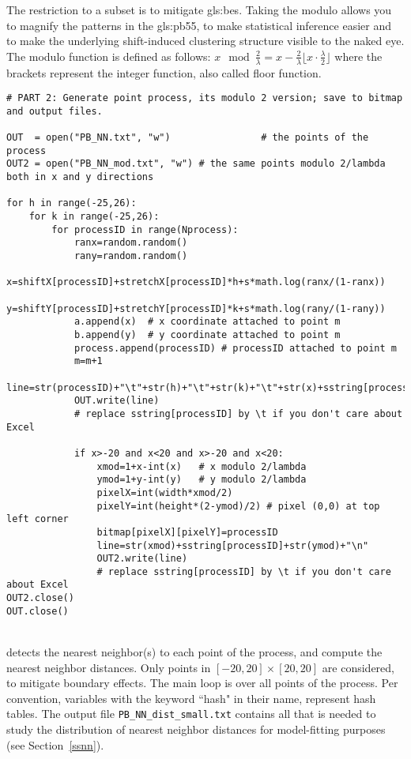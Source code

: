 \documentclass[10pt]{article}
\begin{document}
The restriction to a subset is to mitigate
\glspl{gls:be}. Taking the modulo allows you to magnify the patterns in the
\gls{gls:pb55}, to make
statistical inference easier and to make the underlying shift-induced clustering structure visible to the naked eye.  The modulo function is defined as follows:
$x \mod \frac{2}{\lambda} = x - \frac{2}{\lambda}\lfloor x \cdot \frac{\lambda}{2}\rfloor$
where the brackets represent the integer function, also called floor function.

\begin{lstlisting}
# PART 2: Generate point process, its modulo 2 version; save to bitmap and output files.

OUT  = open("PB_NN.txt", "w")                # the points of the process
OUT2 = open("PB_NN_mod.txt", "w") # the same points modulo 2/lambda both in x and y directions

for h in range(-25,26):
    for k in range(-25,26):
        for processID in range(Nprocess):
            ranx=random.random()
            rany=random.random()
            x=shiftX[processID]+stretchX[processID]*h+s*math.log(ranx/(1-ranx))
            y=shiftY[processID]+stretchY[processID]*k+s*math.log(rany/(1-rany))
            a.append(x)  # x coordinate attached to point m
            b.append(y)  # y coordinate attached to point m
            process.append(processID) # processID attached to point m
            m=m+1
            line=str(processID)+"\t"+str(h)+"\t"+str(k)+"\t"+str(x)+sstring[processID]+str(y)+"\n"
            OUT.write(line)
            # replace sstring[processID] by \t if you don't care about Excel

            if x>-20 and x<20 and x>-20 and x<20:
                xmod=1+x-int(x)   # x modulo 2/lambda
                ymod=1+y-int(y)   # y modulo 2/lambda
                pixelX=int(width*xmod/2)
                pixelY=int(height*(2-ymod)/2) # pixel (0,0) at top left corner
                bitmap[pixelX][pixelY]=processID
                line=str(xmod)+sstring[processID]+str(ymod)+"\n"
                OUT2.write(line)
                # replace sstring[processID] by \t if you don't care about Excel
OUT2.close()
OUT.close()
\end{lstlisting}
\quad \\
 detects the \textcolor{index}{nearest neighbor(s)} to each point of the
process, and compute the \textcolor{index}{nearest neighbor distances}. Only points in $[-20,20]\times[20,20]$ are considered, to mitigate boundary effects. The main loop is over all points of the process. Per convention, variables with the keyword ``hash" in their name, represent
\textcolor{index}{hash tables}. The output file \texttt{PB\_NN\_dist\_small.txt} contains all that is needed to study the distribution of nearest neighbor distances for model-fitting purposes
(see Section~\ref{ssnn}).
\end{document}
